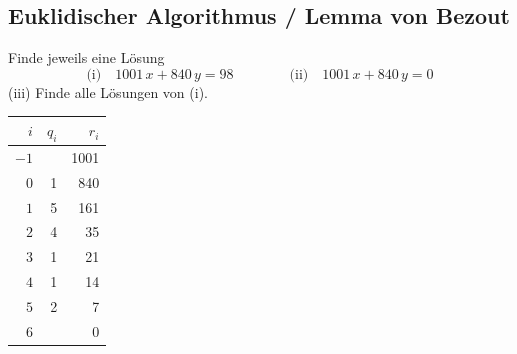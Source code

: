 \subsection{Euklidischer Algorithmus / Lemma von Bezout}

\begin{aufgabe}[Aufgabe 4]
Finde jeweils eine Lösung
\[
\text{(i)}\quad 1001\,x + 840\,y = 98 \qquad\qquad \text{(ii)}\quad 1001\,x + 840\,y = 0
\]
(iii) Finde alle Lösungen von (i).
\end{aufgabe}
\begin{loesung}
\begin{tabular}{r|rr}
\toprule
$i$ & $q_i$ & $r_i$\\
\midrule
$-1$ &     & 1001\\
$0$  & 1   & 840\\
$1$  & 5   & 161\\
$2$  & 4   & 35\\
$3$  & 1   & 21\\
$4$  & 1   & 14\\
$5$  & 2   & 7\\
$6$  &     & 0\\
\bottomrule
\end{tabular}


\end{loesung}
